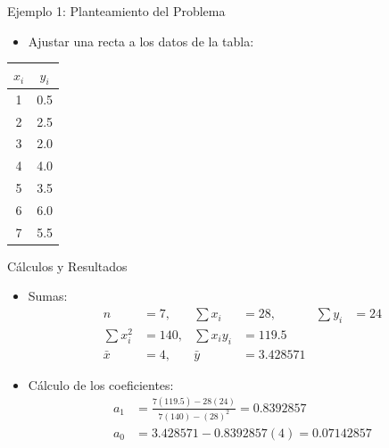 \documentclass[main.tex]{subfiles}
\begin{document}
\begin{frame}{Ejemplo 1: Planteamiento del Problema}
  \begin{itemize}
    \item Ajustar una recta a los datos de la tabla:
  \end{itemize}
  \begin{center}
  \begin{tabular}{|c|c|}
    \hline
    $x_i$ & $y_i$ \\
    \hline
    1 & 0.5 \\
    2 & 2.5 \\
    3 & 2.0 \\
    4 & 4.0 \\
    5 & 3.5 \\
    6 & 6.0 \\
    7 & 5.5 \\
    \hline
  \end{tabular}
  \end{center}
\end{frame}

\begin{frame}{Cálculos y Resultados}
  \begin{itemize}
    \item Sumas:
    \begin{align*}
      n &= 7, & \sum x_i &= 28, & \sum y_i &= 24 \\
      \sum x_i^2 &= 140, & \sum x_iy_i &= 119.5 \\
      \bar{x} &= 4, & \bar{y} &= 3.428571
    \end{align*}
    \item Cálculo de los coeficientes:
    \begin{align*}
      a_1 &= \frac{7(119.5) - 28(24)}{7(140) - (28)^2} = 0.8392857 \\
      a_0 &= 3.428571 - 0.8392857(4) = 0.07142857
    \end{align*}
  \end{itemize}
\end{frame}
\end{document}
